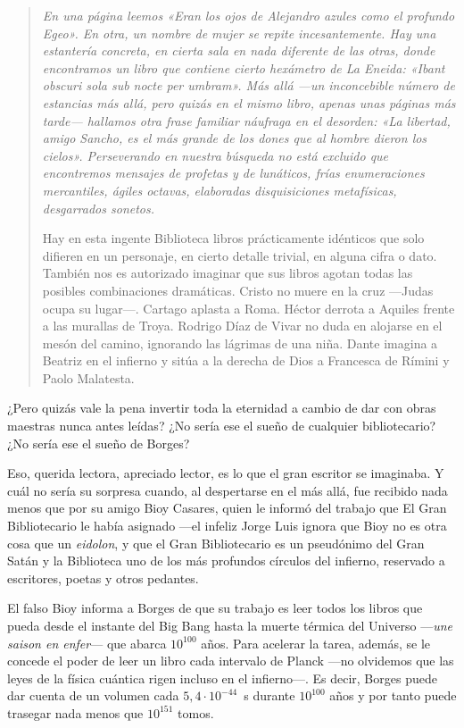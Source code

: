 \documentclass[11pt,a4paper]{article}
\begin{document}
\begin{quotation}\itshape
En una página leemos «Eran los ojos de Alejandro azules como el profundo Egeo». En otra, un nombre de mujer se repite incesantemente. Hay una estantería concreta, en cierta sala en nada diferente de las otras, donde encontramos un libro que contiene cierto hexámetro de \emph{La Eneida}: «Ibant obscuri sola sub nocte per umbram». Más allá ---un inconcebible número de estancias más allá, pero quizás en el mismo libro, apenas unas páginas más tarde--- hallamos otra frase familiar náufraga en el desorden: «La libertad, amigo Sancho, es el más grande de los dones que al hombre dieron los cielos». Perseverando en nuestra búsqueda no está excluido que encontremos mensajes de profetas y de lunáticos, frías enumeraciones mercantiles, ágiles octavas, elaboradas disquisiciones metafísicas, desgarrados sonetos.

Hay en esta ingente Biblioteca libros prácticamente idénticos que solo difieren en un personaje, en cierto detalle trivial, en alguna cifra o dato. También nos es autorizado imaginar que sus libros agotan todas las posibles combinaciones dramáticas. Cristo no muere en la cruz ---Judas ocupa su lugar---. Cartago aplasta a Roma. Héctor derrota a Aquiles frente a las murallas de Troya. Rodrigo Díaz de Vivar no duda en alojarse en el mesón del camino, ignorando las lágrimas de una niña. Dante imagina a Beatriz en el infierno y sitúa a la derecha de Dios a Francesca de Rímini y Paolo Malatesta.
\end{quotation}

¿Pero quizás vale la pena invertir toda la eternidad a cambio de dar con obras maestras nunca antes leídas? ¿No sería ese el sueño de cualquier bibliotecario? ¿No sería ese el sueño de Borges?

Eso, querida lectora, apreciado lector, es lo que el gran escritor se imaginaba. Y cuál no sería su sorpresa cuando, al despertarse en el más allá, fue recibido nada menos que por su amigo Bioy Casares, quien le informó del trabajo que El Gran Bibliotecario le había asignado ---el infeliz Jorge Luis ignora que Bioy no es otra cosa que un \emph{eidolon}, y que el Gran Bibliotecario es un pseudónimo del Gran Satán y la Biblioteca uno de los más profundos círculos del infierno, reservado a escritores, poetas y otros pedantes.

El falso Bioy informa a Borges de que su trabajo es leer todos los libros que pueda desde el instante del Big Bang hasta la muerte térmica del Universo ---\emph{une saison en enfer}--- que abarca $10^{100}$ años. Para acelerar la tarea, además, se le concede el poder de leer un libro cada intervalo de Planck ---no olvidemos que las leyes de la física cuántica rigen incluso en el infierno---. Es decir, Borges puede dar cuenta de un volumen cada $5{,}4\cdot 10^{-44}$~s durante $10^{100}$ años y por tanto puede trasegar nada menos que $10^{151}$ tomos.
\end{document}
